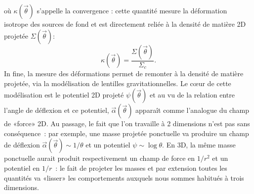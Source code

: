 où $\kappa (\vec{\theta})$ s'appelle la convergence : cette quantité mesure la déformation isotrope des sources de fond et est directement reliée à la densité de matière 2D projetée $\Sigma(\vec{\theta})$:
\begin{equation}
\kappa (\vec{\theta}) =\frac{\Sigma(\vec{\theta})}{\Sigma_c}.
\end{equation}
In fine, la mesure des déformations permet de remonter à la densité de matière projetée, via la modélisation de lentilles gravitationnelles. Le cœur de cette modélisation est le potentiel 2D projeté $\psi(\vec{\theta})$ et au vu de la relation entre l'angle de déflexion et ce potentiel, $\vec{\alpha}(\vec{\theta})$ apparaît comme l'analogue du champ de «force» 2D. Au passage, le fait que l'on travaille à 2 dimensions n'est pas sans conséquence~: par exemple, une masse projetée ponctuelle va produire un champ de déflexion $\vec{\alpha}(\vec{\theta})\sim 1/\theta$ et un potentiel $\psi \sim \log \theta$. En 3D, la même masse ponctuelle aurait produit respectivement un champ de force en $1/r^2$ et un potentiel en $1/r$~: le fait de projeter les masses et par extension toutes les quantités va «lisser» les comportements auxquels nous sommes habitués à trois dimensions.
